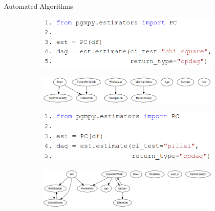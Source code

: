 \documentclass{beamer}
\begin{document}
% 
% 

\begin{frame}{Automated Algorithms}
	\begin{figure}
		\begin{subfigure}{0.5\textwidth}
			\centering
			\includegraphics[scale=0.2]{imgs/pc_chisquare.png}
		\end{subfigure}
		\begin{subfigure}{0.5 \textwidth}
			\centering
			\includegraphics[scale=0.2]{imgs/adult_x2.png}
		\end{subfigure}
	\end{figure}
	\begin{figure}
		\begin{subfigure}{0.5 \textwidth}
			\centering
			\includegraphics[scale=0.2]{imgs/pc_pillai.png}
		\end{subfigure}
		\begin{subfigure}{0.5 \textwidth}
			\centering
			\includegraphics[scale=0.2]{imgs/adult_pillai.png}
		\end{subfigure}
	\end{figure}
\end{frame}
\end{document}
